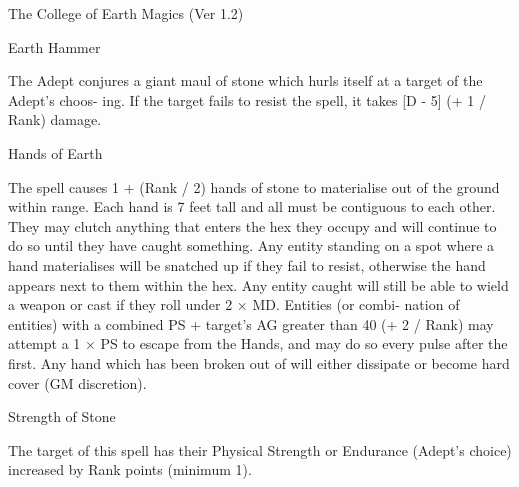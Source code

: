 \begin{Chapter}{The College of Earth Magics (Ver 1.2)}
\begin{spell}[S-1]{Earth Hammer }

\begin{effects}
 The  Adept  conjures  a  giant  maul  of  stone 
which hurls itself at a target of the Adept’s choos-
ing. If the target fails to resist the spell, it takes [D - 
5] (+ 1 / Rank) damage. 

\end{effects}
\end{spell}

\begin{spell}[S-2]{Hands of Earth }

\begin{effects}
 The  spell  causes  1  +  (Rank  /  2)  hands  of 
stone to materialise out of the ground within range. 
Each hand is 7 feet tall and all must be contiguous 
to each other. They may clutch anything that enters 
the  hex  they  occupy  and  will  continue  to  do  so 
until  they  have  caught  something.  Any  entity 
standing  on  a  spot  where  a  hand  materialises  will 
be  snatched  up  if  they  fail  to  resist,  otherwise  the 
hand  appears  next  to  them  within  the  hex.  Any 
entity caught will still be able to wield a weapon or 
cast if they roll under 2 × MD. Entities (or combi-
nation  of  entities)  with  a  combined  PS  +  target’s 
AG greater than 40 (+ 2 / Rank) may attempt a 1 × 
PS to escape from the Hands, and may do so every 
pulse  after  the  first.  Any  hand  which  has  been 
broken  out  of  will  either  dissipate  or  become  hard 
cover (GM discretion). 

\end{effects}
\end{spell}

\begin{spell}[S-3]{Strength of Stone }

\begin{effects}
 The  target  of  this  spell  has  their  Physical 
Strength  or  Endurance  (Adept’s  choice)  increased 
by Rank points (minimum 1). 

\end{effects}
\end{spell}


\end{Chapter}
